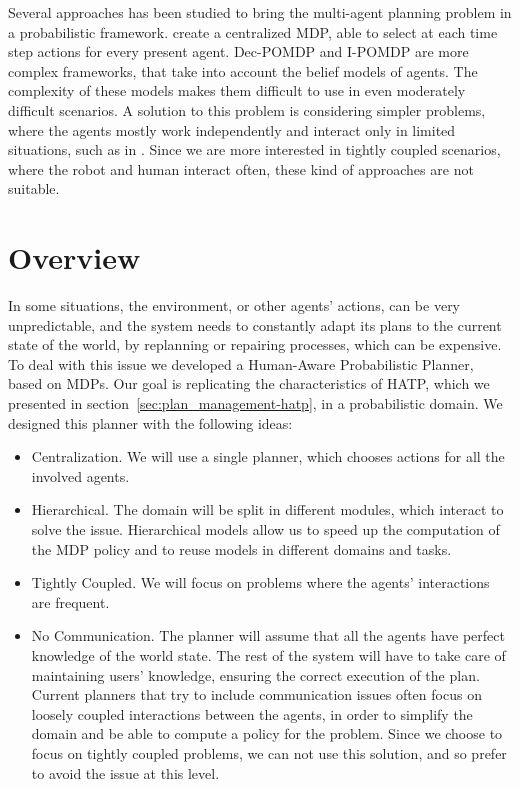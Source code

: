 Several approaches has been studied to bring the multi-agent planning problem in a probabilistic framework. \cite{boutilier1999sequential} create a centralized MDP, able to select at each time step actions for every present agent. Dec-POMDP \cite{bernstein2002complexity} and I-POMDP \cite{gmytrasiewicz2005framework} are more complex frameworks, that take into account the belief models of agents. The complexity of these models makes them difficult to use in even moderately difficult scenarios. A solution to this problem is considering simpler problems, where the agents mostly work independently and interact only in limited situations, such as in \cite{melo2013heuristic}.  Since we are more interested in tightly coupled scenarios, where the robot and human interact often, these kind of approaches are not suitable.

\section{Overview}
\label{sec:mamdp-overview}
In some situations, the environment, or other agents' actions, can be very unpredictable, and the system needs to constantly adapt its plans to the current state of the world, by replanning or repairing processes, which can be expensive. To deal with this issue we developed a Human-Aware Probabilistic Planner, based on MDPs. Our goal is replicating the characteristics of HATP, which we presented in section~\ref{sec:plan_management-hatp}, in a probabilistic domain. We designed this planner with the following ideas:

\begin{itemize}
\item Centralization. We will use a single planner, which chooses actions for all the involved agents.
\item Hierarchical. The domain will be split in different modules, which interact to solve the issue. Hierarchical models allow us to speed up the computation of the MDP policy and to reuse models in different domains and tasks.
\item Tightly Coupled. We will focus on problems where the agents' interactions are frequent.
\item No Communication. The planner will  assume that all the agents have perfect knowledge of the world state. The rest of the system will have to take care of maintaining users' knowledge, ensuring the correct execution of the plan. Current planners that try to include communication issues often focus on loosely coupled interactions between the agents, in order to simplify the domain and be able to compute a policy for the problem. Since we choose to focus on tightly coupled problems, we can not use this solution, and so prefer to avoid the issue at this level.
\end{itemize}

